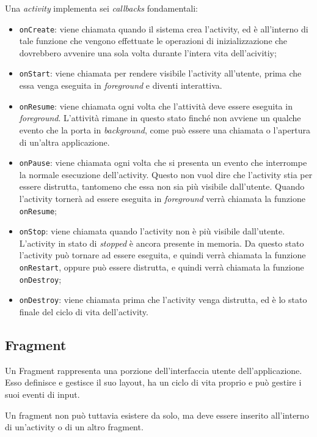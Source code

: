 Una \emph{activity} implementa sei \emph{callbacks} fondamentali:

\begin{itemize}
    \item \texttt{onCreate}: viene chiamata quando il sistema crea l'activity, ed è all'interno di tale funzione che vengono effettuate le operazioni di inizializzazione che dovrebbero avvenire una sola volta durante l'intera vita dell'acivitiy;
    \item \texttt{onStart}: viene chiamata per rendere visibile l'activity all'utente, prima che essa venga eseguita in \emph{foreground} e diventi interattiva.
    \item \texttt{onResume}: viene chiamata ogni volta che l'attività deve essere eseguita in \emph{foreground}. L'attività rimane in questo stato finché non avviene un qualche evento che la porta in \emph{background}, come può essere una chiamata o l'apertura di un'altra applicazione.
    \item \texttt{onPause}: viene chiamata ogni volta che si presenta un evento che interrompe la normale esecuzione dell'activity. Questo non vuol dire che l'activity stia per essere distrutta, tantomeno che essa non sia più visibile dall'utente. Quando l'activity tornerà ad essere eseguita in \emph{foreground} verrà chiamata la funzione \texttt{onResume};
    \item \texttt{onStop}: viene chiamata quando l'activity non è più visibile dall'utente. L'activity in stato di \emph{stopped} è ancora presente in memoria. Da questo stato l'activity può tornare ad essere eseguita, e quindi verrà chiamata la funzione \texttt{onRestart}, oppure può essere distrutta, e quindi verrà chiamata la funzione \texttt{onDestroy};
    \item \texttt{onDestroy}: viene chiamata prima che l'activity venga distrutta, ed è lo stato finale del ciclo di vita dell'activity.
\end{itemize}
\hypertarget{fragment}{%
\subsection{Fragment}\label{fragment}}

Un Fragment rappresenta una porzione dell'interfaccia utente dell'applicazione. Esso definisce e gestisce il suo layout, ha un ciclo di vita proprio e può gestire i suoi eventi di input.

Un fragment non può tuttavia esistere da solo, ma deve essere inserito all'interno di un'activity o di un altro fragment.


